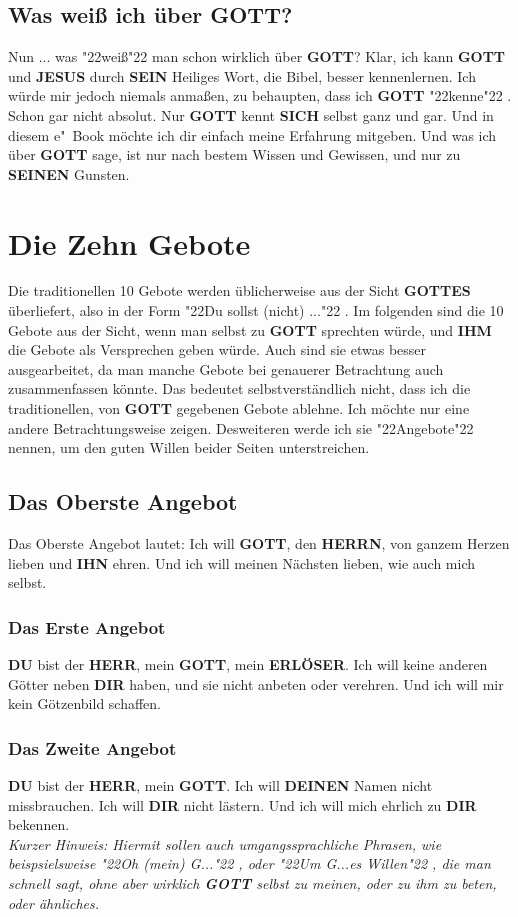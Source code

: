 \documentclass[12pt,a4paper]{article}
\newcommand{\Deinen}[0]{\textbf{DEINEN}}
\newcommand{\Dir}[0]{\textbf{DIR}}
\newcommand{\Du}[0]{\textbf{DU}}
\newcommand{\Erloeser}[0]{\textbf{ERL\"OSER}}
\newcommand{\Gottes}[0]{\textbf{GOTTES}}
\newcommand{\Gott}[0]{\textbf{GOTT}}
\newcommand{\Herrn}[0]{\textbf{HERRN}}
\newcommand{\Herr}[0]{\textbf{HERR}}
\newcommand{\Ihm}[0]{\textbf{IHM}}
\newcommand{\Ihn}[0]{\textbf{IHN}}
\newcommand{\Jesus}[0]{\textbf{JESUS}}
\newcommand{\Seinen}[0]{\textbf{SEINEN}}
\newcommand{\Sein}[0]{\textbf{SEIN}}
\newcommand{\Sich}[0]{\textbf{SICH}}
\newcommand{\q}[1]{\char"22{#1}\char"22 }
\begin{document}
	\subsection{Was wei{\ss} ich \"uber {\Gott}?}
		Nun ... was \q{wei{\ss}} man schon wirklich \"uber {\Gott}?
		Klar,
		ich kann {\Gott} und {\Jesus} durch {\Sein} Heiliges Wort,
		die Bibel,
		besser kennenlernen.
		Ich w\"urde mir jedoch niemals anma{\ss}en,
		zu behaupten,
		dass ich {\Gott} \q{kenne}.
		Schon gar nicht absolut.
		Nur {\Gott} kennt {\Sich} selbst ganz und gar.
		Und in diesem e"~Book m\"ochte ich dir einfach meine Erfahrung mitgeben.
		Und was ich \"uber {\Gott} sage,
		ist nur nach bestem Wissen und Gewissen,
		und nur zu {\Seinen} Gunsten.

	\newpage
	\section{Die Zehn Gebote}
		Die traditionellen 10 Gebote werden \"ublicherweise aus der Sicht {\Gottes} \"uberliefert,
		also in der Form \q{Du sollst (nicht) ...}.
		Im folgenden sind die 10 Gebote aus der Sicht,
		wenn man selbst zu {\Gott} sprechten w\"urde,
		und {\Ihm} die Gebote als Versprechen geben w\"urde.
		Auch sind sie etwas besser ausgearbeitet,
		da man manche Gebote bei genauerer Betrachtung auch zusammenfassen k\"onnte.
		Das bedeutet selbstverst\"andlich nicht,
		dass ich die traditionellen,
		von {\Gott} gegebenen Gebote ablehne.
		Ich m\"ochte nur eine andere Betrachtungsweise zeigen.
		Desweiteren werde ich sie \q{Angebote} nennen,
		um den guten Willen beider Seiten unterstreichen.
	
	\subsection{Das Oberste Angebot}
		Das Oberste Angebot lautet:
		Ich will {\Gott}, den {\Herrn}, von ganzem Herzen lieben und {\Ihn} ehren. Und ich will meinen N\"achsten lieben, wie auch mich selbst.
		
	\subsubsection{Das Erste Angebot}
		{\Du} bist der {\Herr},
		mein {\Gott},
		mein {\Erloeser}.
		Ich will keine anderen G\"otter neben {\Dir} haben,
		und sie nicht anbeten oder verehren.
		Und ich will mir kein G\"otzenbild schaffen.
		
	\subsubsection{Das Zweite Angebot}
		{\Du} bist der {\Herr},
		mein {\Gott}.
		Ich will {\Deinen} Namen nicht missbrauchen.
		Ich will {\Dir} nicht l\"astern.
		Und ich will mich ehrlich zu {\Dir} bekennen.
		\\
		\textit{Kurzer Hinweis:
		Hiermit sollen auch umgangssprachliche Phrasen,
		wie beispsielsweise \q{Oh (mein) G...},
		oder \q{Um G...es Willen},
		die man schnell sagt,
		ohne aber wirklich {\Gott} selbst zu meinen,
		oder zu ihm zu beten,
		oder \"ahnliches.}
			
\end{document}
